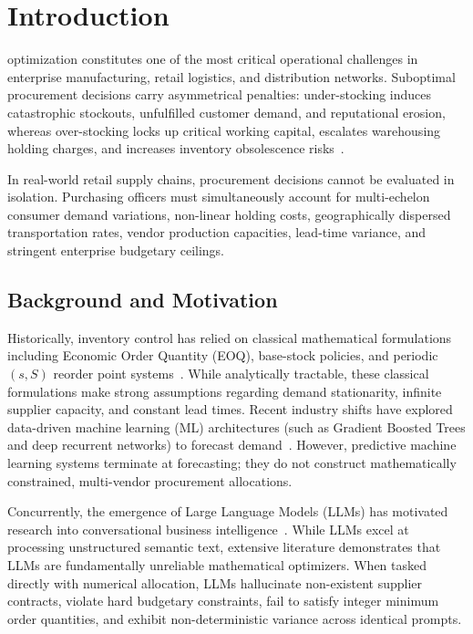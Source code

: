 \documentclass[conference]{IEEEtran}
\begin{document}
\section{Introduction}
 optimization constitutes one of the most critical operational challenges in enterprise manufacturing, retail logistics, and distribution networks. Suboptimal procurement decisions carry asymmetrical penalties: under-stocking induces catastrophic stockouts, unfulfilled customer demand, and reputational erosion, whereas over-stocking locks up critical working capital, escalates warehousing holding charges, and increases inventory obsolescence risks~\cite{axsater2015}.

In real-world retail supply chains, procurement decisions cannot be evaluated in isolation. Purchasing officers must simultaneously account for multi-echelon consumer demand variations, non-linear holding costs, geographically dispersed transportation rates, vendor production capacities, lead-time variance, and stringent enterprise budgetary ceilings.

\subsection{Background and Motivation}
Historically, inventory control has relied on classical mathematical formulations including Economic Order Quantity (EOQ), base-stock policies, and periodic $(s, S)$ reorder point systems~\cite{axsater2015}. While analytically tractable, these classical formulations make strong assumptions regarding demand stationarity, infinite supplier capacity, and constant lead times. Recent industry shifts have explored data-driven machine learning (ML) architectures (such as Gradient Boosted Trees and deep recurrent networks) to forecast demand~\cite{wang2023}. However, predictive machine learning systems terminate at forecasting; they do not construct mathematically constrained, multi-vendor procurement allocations.

Concurrently, the emergence of Large Language Models (LLMs) has motivated research into conversational business intelligence~\cite{invagent2024, wu2025}. While LLMs excel at processing unstructured semantic text, extensive literature demonstrates that LLMs are fundamentally unreliable mathematical optimizers. When tasked directly with numerical allocation, LLMs hallucinate non-existent supplier contracts, violate hard budgetary constraints, fail to satisfy integer minimum order quantities, and exhibit non-deterministic variance across identical prompts.
\end{document}

